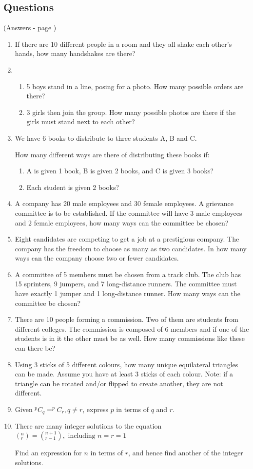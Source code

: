 \documentclass[../main.tex]{subfiles}
\begin{document}
\subsection*{Questions}
(Answers - page \pageref{Combinations answers})
\label{Combinations and permuations}
\begin{enumerate}
    \item 
    If there are 10 different people in a room and they all shake each other’s hands, how many handshakes are there?
    \item 
        \begin{enumerate}
            \item 5 boys stand in a line, posing for a photo. How many possible orders are there?
            \item 3 girls then join the group. How many possible photos are there if the girls must stand next to each other?
        \end{enumerate}
    \item 
    We have 6 books to distribute to three students A, B and C.

    How many different ways are there of distributing these books if:
        \begin{enumerate}
            \item A is given 1 book, B is given 2 books, and C is given 3 books?
            \item Each student is given 2 books?
        \end{enumerate}
    \item 
    A company has 20 male employees and 30 female employees. A grievance committee is to be established. If the committee will have 3 male employees and 2 female employees, how many ways can the committee be chosen?
    \item 
    Eight candidates are competing to get a job at a prestigious company. The company has the freedom to choose as many as two candidates. In how many ways can the company choose two or fewer candidates.
    \item 
    A committee of 5 members must be chosen from a track club. The club has 15 sprinters, 9 jumpers, and 7 long-distance runners. The committee must have exactly 1 jumper and 1 long-distance runner. How many ways can the committee be chosen?
    \item 
    There are 10 people forming a commission. Two of them are students from different colleges. The commission is composed of 6 members and if one of the students is in it the other must be as well. How many commissions like these can there be?
    \item 
    Using 3 sticks of 5 different colours, how many unique equilateral triangles can be made. Assume you have at least 3 sticks of each colour. Note: if a triangle can be rotated and/or flipped to create another, they are not different.
    \item 
    Given \(^pC_q=^pC_r, q\neq r\), express \(p\) in terms of \(q\) and \(r\).
    \item 
    There are many integer solutions to the equation \((^n_r)=(^{n+1}_{r-1}),\text{ including } n=r=1 \)
    
    Find an expression for \(n\) in terms of \(r\), and hence find another of the integer solutions.
\end{enumerate}
\end{document}

